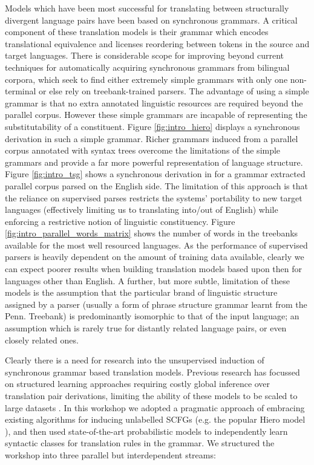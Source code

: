 Models which have been most successful for translating between structurally divergent language pairs have been based on synchronous grammars. 
A critical component of these translation models is their {\emph grammar} which encodes translational equivalence and licenses reordering between tokens in the source and target languages. 
There is considerable scope for improving beyond current techniques for automatically acquiring synchronous grammars from bilingual corpora, which seek to find either extremely simple grammars with only one non-terminal or else rely on treebank-trained parsers.
The advantage of using a simple grammar is that no extra annotated linguistic resources are required beyond the parallel corpus.
However these simple grammars are incapable of representing the substitutability of a constituent.
Figure \ref{fig:intro_hiero} displays a synchronous derivation in such a simple grammar.
Richer grammars induced from a parallel corpus annotated with syntax trees overcome the limitations of the simple grammars and provide a far more powerful representation of language structure. 
Figure \ref{fig:intro_tsg} shows a synchronous derivation in for a grammar extracted parallel corpus parsed on the English side.
The limitation of this approach is that the reliance on supervised parses restricts the systems' portability to new target languages (effectively limiting us to translating into/out of English) while enforcing a restrictive notion of linguistic constituency. 
Figure \ref{fig:intro_parallel_words_matrix} shows the number of words in the treebanks available for the most well resourced languages. 
As the performance of supervised parsers is heavily dependent on the amount of training data available, clearly we can expect poorer results when building translation models based upon then for languages other than English.
A further, but more subtle, limitation of these models is the assumption that the particular brand of linguistic structure assigned by a parser (usually a form of phrase structure grammar learnt from the Penn. Treebank) is predominantly isomorphic to that of the input language; an assumption which is rarely true for distantly related language pairs, or even closely related ones.



Clearly there is a need for research into the unsupervised induction of synchronous grammar based translation models.
Previous research has focussed on structured learning approaches requiring costly global inference over translation pair derivations, limiting the ability of these models to be scaled to large datasets \cite{blunsom09bscfg}.
In this workshop we adopted a pragmatic approach of embracing existing algorithms for inducing unlabelled SCFGs (e.g. the popular Hiero model \cite{chiang07hierarchical}), and then used state-of-the-art probabilistic models to independently learn syntactic classes for translation rules in the grammar.
We structured the workshop into three parallel but interdependent streams:

